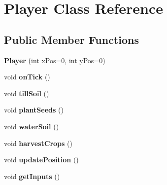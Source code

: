 \hypertarget{class_player}{\section{Player Class Reference}
\label{class_player}
}
\subsection*{Public Member Functions}
\begin{DoxyCompactItemize}
\item 
\hypertarget{class_player_a23d14d23255d0c0b291d750f6e9982b1}{{\bfseries Player} (int x\-Pos=0, int y\-Pos=0)}\label{class_player_a23d14d23255d0c0b291d750f6e9982b1}

\item 
\hypertarget{class_player_aa6a9d06e481e62626da52db9a6c79023}{void {\bfseries on\-Tick} ()}\label{class_player_aa6a9d06e481e62626da52db9a6c79023}

\item 
\hypertarget{class_player_abe2b38c7cda8362dcf1063eb1546d778}{void {\bfseries till\-Soil} ()}\label{class_player_abe2b38c7cda8362dcf1063eb1546d778}

\item 
\hypertarget{class_player_a552c0385003f06eae35485994b64b990}{void {\bfseries plant\-Seeds} ()}\label{class_player_a552c0385003f06eae35485994b64b990}

\item 
\hypertarget{class_player_a210c9c1c4ae5a84ceb467ed39d9117c3}{void {\bfseries water\-Soil} ()}\label{class_player_a210c9c1c4ae5a84ceb467ed39d9117c3}

\item 
\hypertarget{class_player_a5a013cb0ff7607a6968048780f25505b}{void {\bfseries harvest\-Crops} ()}\label{class_player_a5a013cb0ff7607a6968048780f25505b}

\item 
\hypertarget{class_player_a1cb7ff18fe3b07cc1dcd27519bde8329}{void {\bfseries update\-Position} ()}\label{class_player_a1cb7ff18fe3b07cc1dcd27519bde8329}

\item 
\hypertarget{class_player_a6818aa1ce188127d3e9d0209cdcbcdb4}{void {\bfseries get\-Inputs} ()}\label{class_player_a6818aa1ce188127d3e9d0209cdcbcdb4}

\end{DoxyCompactItemize}
